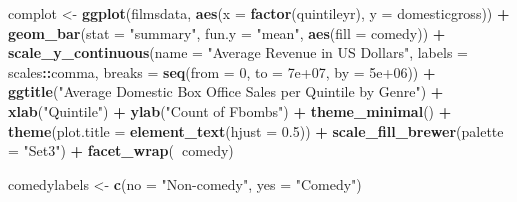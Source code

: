 \documentclass[]{article}
\newenvironment{Shaded}{\begin{snugshade}}{\end{snugshade}}
\newcommand{\DataTypeTok}[1]{\textcolor[rgb]{0.13,0.29,0.53}{#1}}
\newcommand{\DecValTok}[1]{\textcolor[rgb]{0.00,0.00,0.81}{#1}}
\newcommand{\FloatTok}[1]{\textcolor[rgb]{0.00,0.00,0.81}{#1}}
\newcommand{\KeywordTok}[1]{\textcolor[rgb]{0.13,0.29,0.53}{\textbf{#1}}}
\newcommand{\NormalTok}[1]{#1}
\newcommand{\OperatorTok}[1]{\textcolor[rgb]{0.81,0.36,0.00}{\textbf{#1}}}
\newcommand{\StringTok}[1]{\textcolor[rgb]{0.31,0.60,0.02}{#1}}
\begin{document}
\begin{Shaded}
\begin{Highlighting}[]
\NormalTok{complot <-}\StringTok{ }\KeywordTok{ggplot}\NormalTok{(filmsdata, }\KeywordTok{aes}\NormalTok{(}\DataTypeTok{x =} \KeywordTok{factor}\NormalTok{(quintileyr), }\DataTypeTok{y =}\NormalTok{ domesticgross)) }\OperatorTok{+}\StringTok{ }
\StringTok{    }\KeywordTok{geom_bar}\NormalTok{(}\DataTypeTok{stat =} \StringTok{"summary"}\NormalTok{, }\DataTypeTok{fun.y =} \StringTok{"mean"}\NormalTok{, }\KeywordTok{aes}\NormalTok{(}\DataTypeTok{fill =}\NormalTok{ comedy)) }\OperatorTok{+}\StringTok{ }
\StringTok{    }\KeywordTok{scale_y_continuous}\NormalTok{(}\DataTypeTok{name =} \StringTok{"Average Revenue in US Dollars"}\NormalTok{, }
        \DataTypeTok{labels =}\NormalTok{ scales}\OperatorTok{::}\NormalTok{comma, }\DataTypeTok{breaks =} \KeywordTok{seq}\NormalTok{(}\DataTypeTok{from =} \DecValTok{0}\NormalTok{, }\DataTypeTok{to =} \FloatTok{7e+07}\NormalTok{, }
            \DataTypeTok{by =} \FloatTok{5e+06}\NormalTok{)) }\OperatorTok{+}\StringTok{ }\KeywordTok{ggtitle}\NormalTok{(}\StringTok{"Average Domestic Box Office Sales per Quintile by Genre"}\NormalTok{) }\OperatorTok{+}\StringTok{ }
\StringTok{    }\KeywordTok{xlab}\NormalTok{(}\StringTok{"Quintile"}\NormalTok{) }\OperatorTok{+}\StringTok{ }\KeywordTok{ylab}\NormalTok{(}\StringTok{"Count of Fbombs"}\NormalTok{) }\OperatorTok{+}\StringTok{ }\KeywordTok{theme_minimal}\NormalTok{() }\OperatorTok{+}\StringTok{ }
\StringTok{    }\KeywordTok{theme}\NormalTok{(}\DataTypeTok{plot.title =} \KeywordTok{element_text}\NormalTok{(}\DataTypeTok{hjust =} \FloatTok{0.5}\NormalTok{)) }\OperatorTok{+}\StringTok{ }\KeywordTok{scale_fill_brewer}\NormalTok{(}\DataTypeTok{palette =} \StringTok{"Set3"}\NormalTok{) }\OperatorTok{+}\StringTok{ }
\StringTok{    }\KeywordTok{facet_wrap}\NormalTok{(}\OperatorTok{~}\NormalTok{comedy)}

\NormalTok{comedylabels <-}\StringTok{ }\KeywordTok{c}\NormalTok{(}\DataTypeTok{no =} \StringTok{"Non-comedy"}\NormalTok{, }\DataTypeTok{yes =} \StringTok{"Comedy"}\NormalTok{)}


\end{Highlighting}
\end{Shaded}
\end{document}
